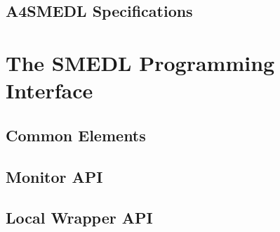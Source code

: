 \documentclass[paper=letter]{scrreport}
\begin{document}

\chapter{A4SMEDL Specifications}
\label{ch:a4smedl}





\part{The SMEDL Programming Interface}
\label{part:api}


\chapter{Common Elements}



\chapter{Monitor API}


\chapter{Local Wrapper API}
\end{document}
